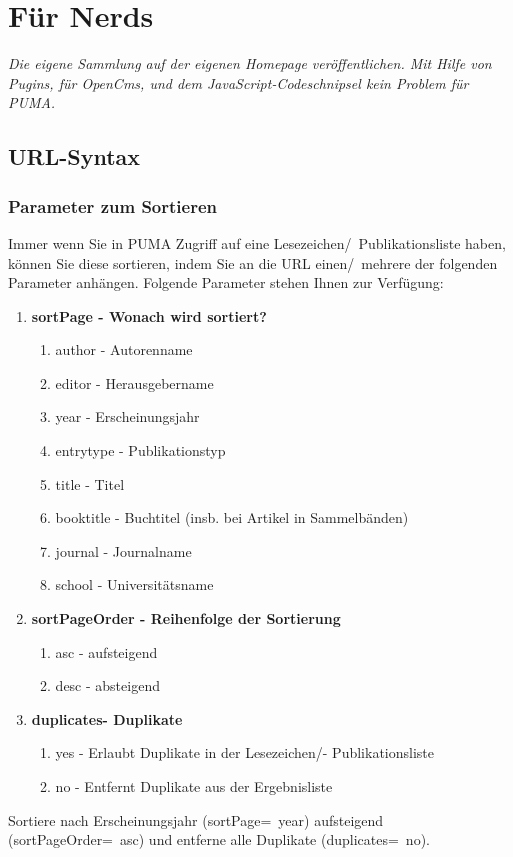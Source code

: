 \chapter{Für Nerds}
\label{ch:fuerNerds}
\textit{Die eigene Sammlung auf der eigenen Homepage veröffentlichen. Mit Hilfe von Pugins, für OpenCms,  und dem JavaScript-Codeschnipsel kein Problem für PUMA.}
\section{URL-Syntax}
\label{sec:urlSyntax}
\subsection{Parameter zum Sortieren}
\label{subsec:sortierparameter}
Immer wenn Sie in PUMA Zugriff auf eine Lesezeichen/~Publikationsliste haben, können Sie diese sortieren, indem Sie an die URL einen/~mehrere der folgenden Parameter anhängen. Folgende Parameter stehen Ihnen zur Verfügung:
\begin{enumerate}
    \item \textbf{sortPage - Wonach wird sortiert?}
    \begin{enumerate}
        \item author - Autorenname
        \item editor - Herausgebername
        \item year - Erscheinungsjahr
        \item entrytype - Publikationstyp
        \item title - Titel
        \item booktitle - Buchtitel (insb. bei Artikel in Sammelbänden)
        \item journal - Journalname
        \item school - Universitätsname 
    \end{enumerate}
    \item \textbf{sortPageOrder - Reihenfolge der Sortierung}
    \begin{enumerate}
        \item asc - aufsteigend
        \item desc - absteigend 
    \end{enumerate}
    \item \textbf{duplicates- Duplikate}
    \begin{enumerate}
        \item yes - Erlaubt Duplikate in der Lesezeichen/- Publikationsliste
        \item no - Entfernt Duplikate aus der Ergebnisliste
    \end{enumerate}
\end{enumerate}
Sortiere nach Erscheinungsjahr (sortPage=~year) aufsteigend (sortPageOrder=~asc) und entferne alle Duplikate (duplicates=~no). \newline
\newline
